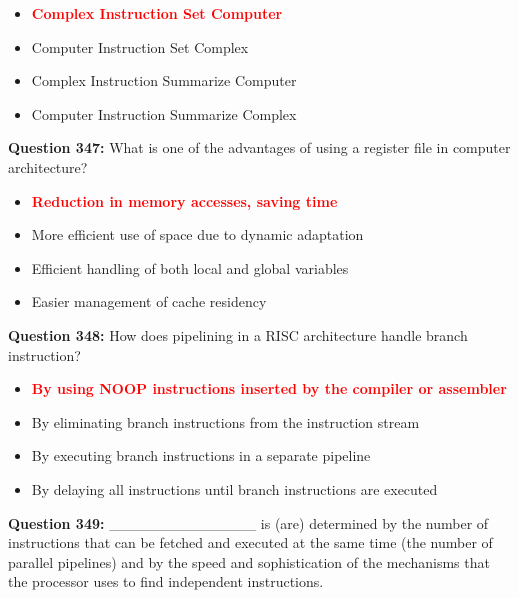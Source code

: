 \documentclass[12pt,a4paper]{article}
\begin{document}
\begin{itemize}
    \item[\textbf{A.}] \textcolor{red}{\textbf{Complex Instruction Set Computer}}
    \item[\textbf{B.}] Computer Instruction Set Complex
    \item[\textbf{C.}] Complex Instruction Summarize Computer
    \item[\textbf{D.}] Computer Instruction Summarize Complex
\end{itemize}

\vspace{0.5cm}

\textbf{Question 347:} What is one of the advantages of using a register file in computer architecture?

\begin{itemize}
    \item[\textbf{A.}] \textcolor{red}{\textbf{Reduction in memory accesses, saving time}}
    \item[\textbf{B.}] More efficient use of space due to dynamic adaptation
    \item[\textbf{C.}] Efficient handling of both local and global variables
    \item[\textbf{D.}] Easier management of cache residency
\end{itemize}

\vspace{0.5cm}

\textbf{Question 348:} How does pipelining in a RISC architecture handle branch instruction?

\begin{itemize}
    \item[\textbf{A.}] \textcolor{red}{\textbf{By using NOOP instructions inserted by the compiler or assembler}}
    \item[\textbf{B.}] By eliminating branch instructions from the instruction stream
    \item[\textbf{C.}] By executing branch instructions in a separate pipeline
    \item[\textbf{D.}] By delaying all instructions until branch instructions are executed
\end{itemize}

\vspace{0.5cm}

\textbf{Question 349:} ______________ is (are) determined by the number of instructions that can be fetched and executed at the same time (the number of parallel pipelines) and by the speed and sophistication of the mechanisms that the processor uses to find independent instructions.
\end{document}
